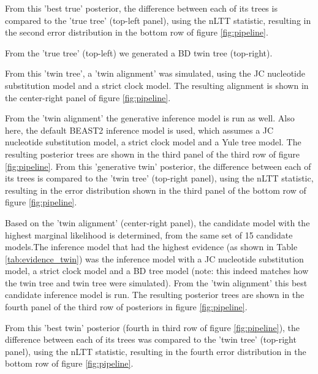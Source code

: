 From this 'best true' posterior, the difference between each of its trees is
compared to the 'true tree' (top-left panel), using the nLTT statistic,
resulting in the second error distribution in the bottom row
of figure \ref{fig:pipeline}.

From the 'true tree' (top-left) we generated a BD twin tree (top-right).

From this 'twin tree', a 'twin alignment' was simulated, using
the JC nucleotide substitution model and a strict clock model.
The resulting alignment is shown in the center-right panel
of figure \ref{fig:pipeline}.

From the 'twin alignment' the generative inference model is run as well.
Also here, the default BEAST2 inference model is used, 
which assumes a JC nucleotide
substitution model, a strict clock model and a Yule tree model.
The resulting posterior trees are shown in the
third panel of the third row of figure \ref{fig:pipeline}.
From this 'generative twin' posterior, 
the difference between each of its trees is
compared to the 'twin tree' (top-right panel), using the nLTT statistic,
resulting in the error distribution shown in the third panel
of the bottom row of figure \ref{fig:pipeline}.

Based on the 'twin alignment' (center-right panel), the candidate model
with the highest marginal likelihood is determined, from the same 
set of 15 candidate models.The inference model that had the
highest evidence (as shown in Table \ref{tab:evidence_twin}) was 
the inference model with a JC nucleotide substitution model,
a strict clock model and a BD tree model (note: this indeed matches how
the twin tree and twin tree were simulated).
From the 'twin alignment' this best candidate inference model is run.
The resulting posterior trees are shown in the fourth panel
of the third row of posteriors in figure \ref{fig:pipeline}.

From this 'best twin' posterior (fourth in third row of
figure \ref{fig:pipeline}), the difference between each of its trees was
compared to the 'twin tree' (top-right panel), using the nLTT statistic,
resulting in the fourth error distribution in the bottom row
of figure \ref{fig:pipeline}.

